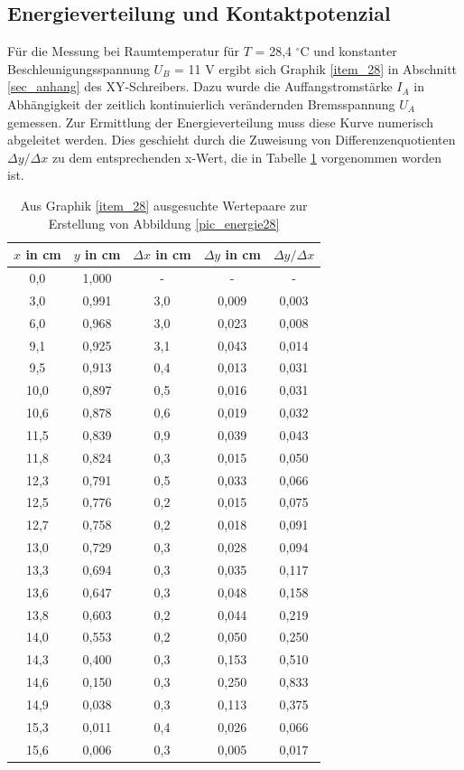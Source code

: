 \subsection{Energieverteilung und Kontaktpotenzial}
\label{sec_energie}
Für die Messung bei Raumtemperatur für $T$ = 28,4 $^\circ$C und konstanter Beschleunigungsspannung $U_B$ = 11 V ergibt sich Graphik 
\ref{item_28} in Abschnitt \ref{sec_anhang} des XY-Schreibers. Dazu wurde die Auffangstromstärke $I_A$ in Abhängigkeit der zeitlich kontinuierlich verändernden
Bremsspannung $U_A$ gemessen. Zur Ermittlung der Energieverteilung muss diese Kurve numerisch abgeleitet werden. Dies geschieht durch
die Zuweisung von Differenzenquotienten $\Delta y / \Delta x$ zu dem entsprechenden x-Wert, die in Tabelle \ref{tab_energie28} vorgenommen worden ist.
\begin{table}[H]
 \begin{tabular}{c|c|c|c|c}
$x$ in cm & $y$ in cm & $\Delta x$ in cm& $\Delta y$ in cm & $\Delta y / \Delta x$\\
\hline
0,0&	1,000&	-&	-&	- \\
3,0&	0,991&	3,0&	0,009&	0,003\\
6,0&	0,968&	3,0&	0,023&	0,008\\
9,1&	0,925&	3,1&	0,043&	0,014\\
9,5&	0,913&	0,4&	0,013&	0,031\\
10,0&	0,897&	0,5&	0,016&	0,031\\
10,6&	0,878&	0,6&	0,019&	0,032\\
11,5&	0,839&	0,9&	0,039&	0,043\\
11,8&	0,824&	0,3&	0,015&	0,050\\
12,3&	0,791&	0,5&	0,033&	0,066\\
12,5&	0,776&	0,2&	0,015&	0,075\\
12,7&	0,758&	0,2&	0,018&	0,091\\
13,0&	0,729&	0,3&	0,028&	0,094\\
13,3&	0,694&	0,3&	0,035&	0,117\\
13,6&	0,647&	0,3&	0,048&	0,158\\
13,8&	0,603&	0,2&	0,044&	0,219\\
14,0&	0,553&	0,2&	0,050&	0,250\\
14,3&	0,400&	0,3&	0,153&	0,510\\
14,6&	0,150&	0,3&	0,250&	0,833\\
14,9&	0,038&	0,3&	0,113&	0,375\\
15,3&	0,011&	0,4&	0,026&	0,066\\
15,6&	0,006&	0,3&	0,005&	0,017\\
 \end{tabular}
\caption{Aus Graphik \ref{item_28} ausgesuchte Wertepaare zur Erstellung von Abbildung \ref{pic_energie28}}
\label{tab_energie28}
\end{table}
